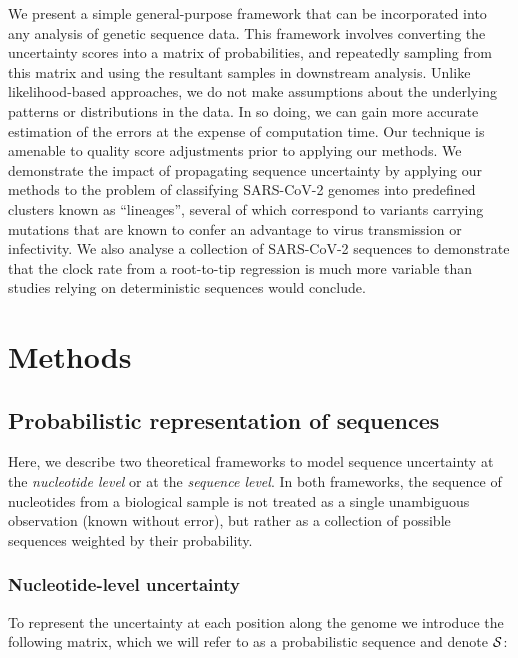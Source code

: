 \documentclass[10pt]{article}
\begin{document}
We present a simple general-purpose framework that can be incorporated into any analysis of genetic sequence data.
This framework involves converting the uncertainty scores into a matrix of probabilities, and repeatedly sampling from this matrix and using the resultant samples in downstream analysis.
Unlike likelihood-based approaches, we do not make assumptions about the underlying patterns or distributions in the data.
In so doing, we can gain more accurate estimation of the errors at the expense of computation time.
Our technique is amenable to quality score adjustments prior to applying our methods.
We demonstrate the impact of propagating sequence uncertainty by applying our methods to the problem of classifying SARS-CoV-2 genomes into predefined clusters known as ``lineages'', several of which correspond to variants carrying mutations that are known to confer an advantage to virus transmission or infectivity.
We also analyse a collection of SARS-CoV-2 sequences to demonstrate that the clock rate from a root-to-tip regression is much more variable than studies relying on deterministic sequences would conclude.



\section{Methods}

\subsection{Probabilistic representation of sequences}

Here, we describe two theoretical frameworks to model sequence uncertainty at the \emph{nucleotide level} or at the \emph{sequence level}.
In both frameworks, the sequence of nucleotides from a biological sample is not treated as a single unambiguous observation (known without error), but rather as a collection of possible sequences weighted by their probability.

\subsubsection{Nucleotide-level uncertainty}

To represent the uncertainty at each position along the genome we introduce the following matrix, which we will refer to as a probabilistic sequence and denote $\mathcal{S}$:

\end{document}
